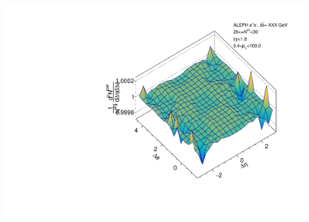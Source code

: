 \begin{figure}[htbp]
\begin{minipage}[b]{0.32\linewidth}
  \end{minipage}
  \begin{minipage}[b]{0.32\linewidth}
    \centering
    \includegraphics[width=\linewidth]{images/TwoParticleCorrelation/LEP1_BEAM/LEP1_BEAM_r_ratio_20_30.pdf}
    \label{fig:LEP1 Beam Axis, Ratio Plot, Multiplicity 20-30, Ratio}
  \end{minipage}
\end{figure}

